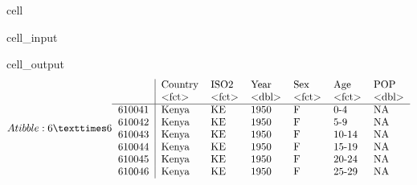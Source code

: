 \documentclass[letterpaper,10pt,english]{jupyterBook}
\begin{document}
\begin{sphinxuseclass}{cell}\begin{sphinxVerbatimInput}

\begin{sphinxuseclass}{cell_input}
\begin{sphinxVerbatim}[commandchars=\\\{\}]
\PYG{p}{[}\PYG{p}{]}
\end{sphinxVerbatim}

\end{sphinxuseclass}\end{sphinxVerbatimInput}
\begin{sphinxVerbatimOutput}

\begin{sphinxuseclass}{cell_output}\begin{equation*}
\begin{split}A tibble: 6 × 6
\begin{tabular}{r|llllll}
  & Country & ISO2 & Year & Sex & Age & POP\\
  & <fct> & <fct> & <dbl> & <fct> & <fct> & <dbl>\\
\hline
	610041 & Kenya & KE & 1950 & F & 0-4   & NA\\
	610042 & Kenya & KE & 1950 & F & 5-9   & NA\\
	610043 & Kenya & KE & 1950 & F & 10-14 & NA\\
	610044 & Kenya & KE & 1950 & F & 15-19 & NA\\
	610045 & Kenya & KE & 1950 & F & 20-24 & NA\\
	610046 & Kenya & KE & 1950 & F & 25-29 & NA\\
\end{tabular}\end{split}
\end{equation*}
\end{sphinxuseclass}\end{sphinxVerbatimOutput}

\end{sphinxuseclass}
\end{document}
